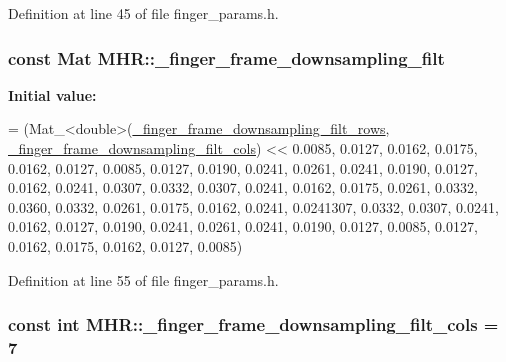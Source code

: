 Definition at line 45 of file finger\+\_\+params.\+h.

\hypertarget{namespace_m_h_r_a9a40d6696920c99016b2c4cc40e8db3b}{
\subsubsection[{\+\_\+finger\+\_\+frame\+\_\+downsampling\+\_\+filt}]{\setlength{\rightskip}{0pt plus 5cm}const Mat M\+H\+R\+::\+\_\+finger\+\_\+frame\+\_\+downsampling\+\_\+filt}}\label{namespace_m_h_r_a9a40d6696920c99016b2c4cc40e8db3b}
{\bfseries Initial value\+:}
\begin{DoxyCode}
=
        (Mat\_<double>(\hyperlink{namespace_m_h_r_a5d49af784fd77df019705d26d3654953}{\_finger\_frame\_downsampling\_filt\_rows}, 
      \hyperlink{namespace_m_h_r_a2c854934355cedc3760bfddd3bcd03a6}{\_finger\_frame\_downsampling\_filt\_cols}) <<
             0.0085, 0.0127, 0.0162, 0.0175, 0.0162, 0.0127, 0.0085,
             0.0127, 0.0190, 0.0241, 0.0261, 0.0241, 0.0190, 0.0127,
             0.0162, 0.0241, 0.0307, 0.0332, 0.0307, 0.0241, 0.0162,
             0.0175, 0.0261, 0.0332, 0.0360, 0.0332, 0.0261, 0.0175,
             0.0162, 0.0241, 0.0241307, 0.0332, 0.0307, 0.0241, 0.0162,
             0.0127, 0.0190, 0.0241, 0.0261, 0.0241, 0.0190, 0.0127,
             0.0085, 0.0127, 0.0162, 0.0175, 0.0162, 0.0127, 0.0085)
\end{DoxyCode}


Definition at line 55 of file finger\+\_\+params.\+h.

\hypertarget{namespace_m_h_r_a2c854934355cedc3760bfddd3bcd03a6}{
\subsubsection[{\+\_\+finger\+\_\+frame\+\_\+downsampling\+\_\+filt\+\_\+cols}]{\setlength{\rightskip}{0pt plus 5cm}const int M\+H\+R\+::\+\_\+finger\+\_\+frame\+\_\+downsampling\+\_\+filt\+\_\+cols = 7}}\label{namespace_m_h_r_a2c854934355cedc3760bfddd3bcd03a6}


